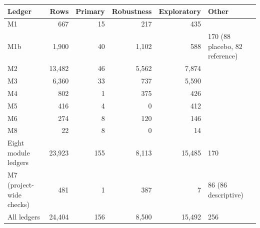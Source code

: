 \begin{tabular}{@{}lrrrrl@{}}
\toprule
Ledger & Rows & Primary & Robustness & Exploratory & Other \\
\midrule
M1 & 667 & 15 & 217 & 435 &  \\
M1b & 1,900 & 40 & 1,102 & 588 & 170 (88 placebo, 82 reference) \\
M2 & 13,482 & 46 & 5,562 & 7,874 &  \\
M3 & 6,360 & 33 & 737 & 5,590 &  \\
M4 & 802 & 1 & 375 & 426 &  \\
M5 & 416 & 4 & 0 & 412 &  \\
M6 & 274 & 8 & 120 & 146 &  \\
M8 & 22 & 8 & 0 & 14 &  \\
\midrule
Eight module ledgers & 23,923 & 155 & 8,113 & 15,485 & 170 \\
M7 (project-wide checks) & 481 & 1 & 387 & 7 & 86 (86 descriptive) \\
\midrule
All ledgers & 24,404 & 156 & 8,500 & 15,492 & 256 \\
\bottomrule
\end{tabular}
